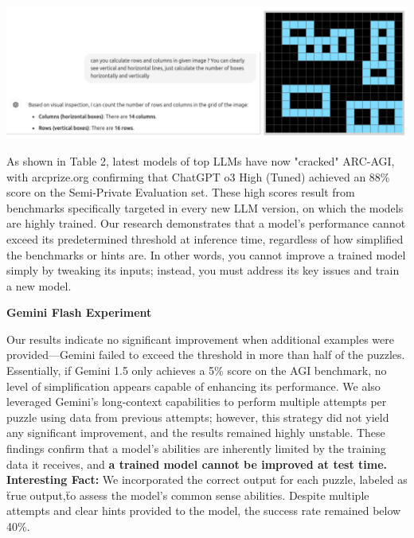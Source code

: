 \documentclass[11pt]{scrartcl}
\begin{document}
\vspace{1cm}

\includegraphics[width=0.99\linewidth, center]{arcagi_1.png}

\vspace{0.5cm}

As shown in Table 2, latest models of top LLMs have now "cracked" ARC-AGI, with arcprize.org confirming that ChatGPT o3 High (Tuned) achieved an 88\% score on the Semi-Private Evaluation set. These high scores result from benchmarks specifically targeted in every new LLM version, on which the models are highly trained. Our research demonstrates that a model’s performance cannot exceed its predetermined threshold at inference time, regardless of how simplified the benchmarks or hints are. In other words, you cannot improve a trained model simply by tweaking its inputs; instead, you must address its key issues and train a new model. \\

\begin{small}
\textbf{Gemini Flash Experiment} \\
\end{small}
Our results indicate no significant improvement when additional examples were provided—Gemini failed to exceed the threshold in more than half of the puzzles. Essentially, if Gemini 1.5 only achieves a 5\% score on the AGI benchmark, no level of simplification appears capable of enhancing its performance. We also leveraged Gemini's long-context capabilities to perform multiple attempts per puzzle using data from previous attempts; however, this strategy did not yield any significant improvement, and the results remained highly unstable. These findings confirm that a model's abilities are inherently limited by the training data it receives, and \textbf{a trained model cannot be improved at test time.} \\

\textbf{Interesting Fact:} We incorporated the correct output for each puzzle, labeled as \"true output,\" to assess the model's common sense abilities. Despite multiple attempts and clear hints provided to the model, the success rate remained below 40\%. \\
\end{document}
